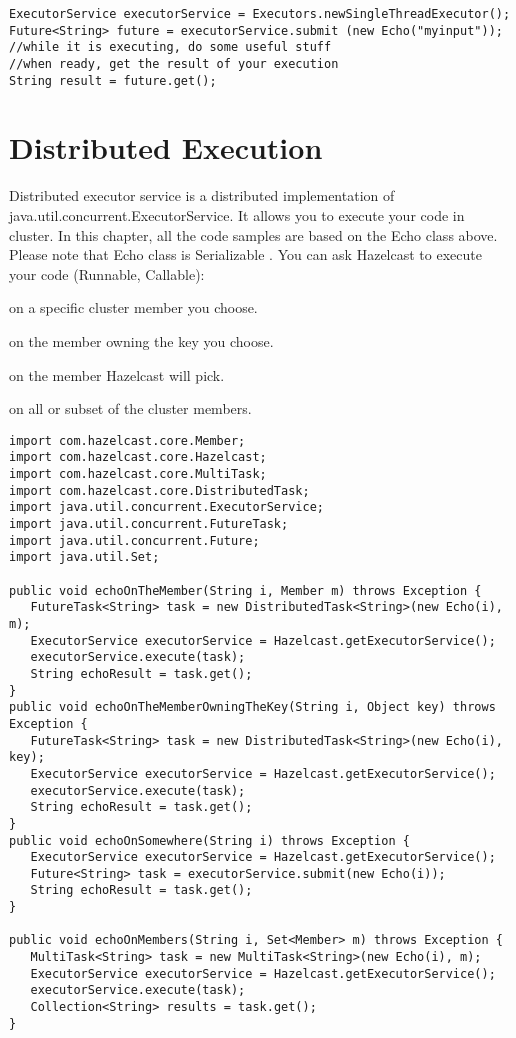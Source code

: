 \begin{verbatim}
ExecutorService executorService = Executors.newSingleThreadExecutor();
Future<String> future = executorService.submit (new Echo("myinput"));
//while it is executing, do some useful stuff
//when ready, get the result of your execution
String result = future.get();
\end{verbatim}

\section{Distributed Execution}

Distributed executor service is a distributed implementation of java.util.concurrent.ExecutorService. It allows you to execute your code in cluster. In this chapter, all the code samples are based on the Echo class above. Please note that Echo class is Serializable . You can ask Hazelcast to execute your code (Runnable, Callable):

on a specific cluster member you choose.

on the member owning the key you choose.

on the member Hazelcast will pick.

on all or subset of the cluster members.

\begin{verbatim}
import com.hazelcast.core.Member;
import com.hazelcast.core.Hazelcast;
import com.hazelcast.core.MultiTask;
import com.hazelcast.core.DistributedTask;
import java.util.concurrent.ExecutorService;   
import java.util.concurrent.FutureTask;   
import java.util.concurrent.Future;   
import java.util.Set;

public void echoOnTheMember(String i, Member m) throws Exception {
   FutureTask<String> task = new DistributedTask<String>(new Echo(i), m);
   ExecutorService executorService = Hazelcast.getExecutorService();
   executorService.execute(task);
   String echoResult = task.get();
}
public void echoOnTheMemberOwningTheKey(String i, Object key) throws Exception {
   FutureTask<String> task = new DistributedTask<String>(new Echo(i), key);
   ExecutorService executorService = Hazelcast.getExecutorService();
   executorService.execute(task);
   String echoResult = task.get();
}
public void echoOnSomewhere(String i) throws Exception { 
   ExecutorService executorService = Hazelcast.getExecutorService();
   Future<String> task = executorService.submit(new Echo(i));
   String echoResult = task.get();
}

public void echoOnMembers(String i, Set<Member> m) throws Exception {
   MultiTask<String> task = new MultiTask<String>(new Echo(i), m);
   ExecutorService executorService = Hazelcast.getExecutorService();
   executorService.execute(task);
   Collection<String> results = task.get();
} 
\end{verbatim}

